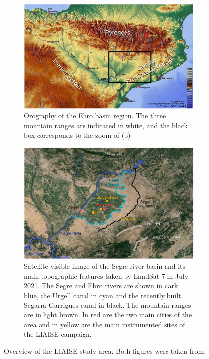 \begin{figure}[hbtp]
    \centering
    \begin{subfigure}{\textwidth}
        \centering
        \includegraphics[width=0.8\linewidth]{images/chap5/liaise_area_ebro_lunel.png}
        \caption{Orography of the Ebro basin region. The three mountain ranges are indicated in white, and the black box corresponds to the zoom of (b)}
    \end{subfigure}
    \begin{subfigure}{\textwidth}
        \centering
        \includegraphics[width=0.7\linewidth]{images/chap5/liaise_area_zoom_lunel.png}
        \caption{Satellite visible image of the Segre river basin and its main topographic features taken by LandSat 7 in July 2021. The Segre and Ebro rivers are shown in dark blue, the Urgell canal in cyan and the recently built Segarra-Garrigues canal in black. The mountain ranges are in light brown. In red are the two main cities of the area and in yellow are the main instrumented sites of the LIAISE campaign.}
    \end{subfigure}
    \caption{Overview of the LIAISE study area. Both figures were taken from\citet{lunel_interactions_2024}.}
    \label{fig:liaise_area_both}
\end{figure}

